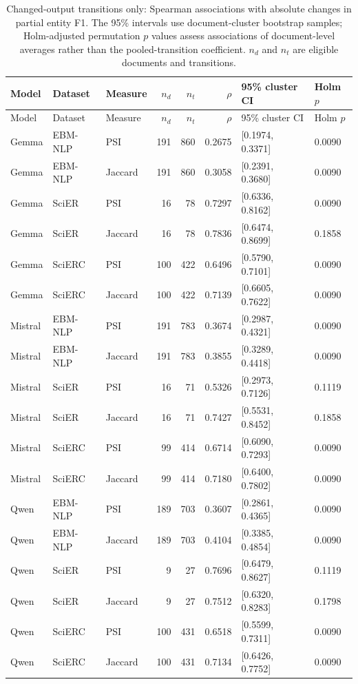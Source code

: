 \documentclass[fleqn,10pt]{wlscirep-authoryear}
\begin{document}
\begingroup
\footnotesize
\setlength{\tabcolsep}{4pt}
\setlength{\LTleft}{0pt}
\setlength{\LTright}{0pt}
\begin{longtable}{lllrrrll}
\caption{Changed-output transitions only: Spearman associations with absolute changes in partial entity F1. The 95\% intervals use document-cluster bootstrap samples; Holm-adjusted permutation $p$ values assess associations of document-level averages rather than the pooled-transition coefficient. $n_d$ and $n_t$ are eligible documents and transitions.}\label{tab:r1-psi-jaccard-full}\\
\toprule
Model & Dataset & Measure & $n_d$ & $n_t$ & $\rho$ & 95\% cluster CI & Holm $p$ \\
\midrule
\endfirsthead
\toprule
Model & Dataset & Measure & $n_d$ & $n_t$ & $\rho$ & 95\% cluster CI & Holm $p$ \\
\midrule
\endhead
\bottomrule
\endfoot
Gemma & EBM-NLP & PSI & 191 & 860 & 0.2675 & [0.1974, 0.3371] & 0.0090 \\
Gemma & EBM-NLP & Jaccard & 191 & 860 & 0.3058 & [0.2391, 0.3680] & 0.0090 \\
\addlinespace[2pt]
Gemma & SciER & PSI & 16 & 78 & 0.7297 & [0.6336, 0.8162] & 0.0090 \\
Gemma & SciER & Jaccard & 16 & 78 & 0.7836 & [0.6474, 0.8699] & 0.1858 \\
\addlinespace[2pt]
Gemma & SciERC & PSI & 100 & 422 & 0.6496 & [0.5790, 0.7101] & 0.0090 \\
Gemma & SciERC & Jaccard & 100 & 422 & 0.7139 & [0.6605, 0.7622] & 0.0090 \\
\addlinespace[2pt]
Mistral & EBM-NLP & PSI & 191 & 783 & 0.3674 & [0.2987, 0.4321] & 0.0090 \\
Mistral & EBM-NLP & Jaccard & 191 & 783 & 0.3855 & [0.3289, 0.4418] & 0.0090 \\
\addlinespace[2pt]
Mistral & SciER & PSI & 16 & 71 & 0.5326 & [0.2973, 0.7126] & 0.1119 \\
Mistral & SciER & Jaccard & 16 & 71 & 0.7427 & [0.5531, 0.8452] & 0.1858 \\
\addlinespace[2pt]
Mistral & SciERC & PSI & 99 & 414 & 0.6714 & [0.6090, 0.7293] & 0.0090 \\
Mistral & SciERC & Jaccard & 99 & 414 & 0.7180 & [0.6400, 0.7802] & 0.0090 \\
\addlinespace[2pt]
Qwen & EBM-NLP & PSI & 189 & 703 & 0.3607 & [0.2861, 0.4365] & 0.0090 \\
Qwen & EBM-NLP & Jaccard & 189 & 703 & 0.4104 & [0.3385, 0.4854] & 0.0090 \\
\addlinespace[2pt]
Qwen & SciER & PSI & 9 & 27 & 0.7696 & [0.6479, 0.8627] & 0.1119 \\
Qwen & SciER & Jaccard & 9 & 27 & 0.7512 & [0.6320, 0.8283] & 0.1798 \\
\addlinespace[2pt]
Qwen & SciERC & PSI & 100 & 431 & 0.6518 & [0.5599, 0.7311] & 0.0090 \\
Qwen & SciERC & Jaccard & 100 & 431 & 0.7134 & [0.6426, 0.7752] & 0.0090 \\
\end{longtable}
\endgroup
\end{document}
